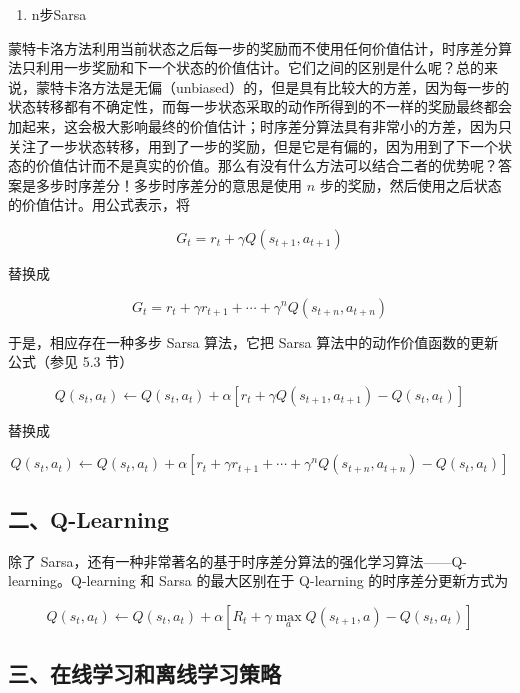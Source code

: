 \begin{enumerate}
\def\labelenumi{\arabic{enumi}.}
\setcounter{enumi}{1}
\tightlist
\item
  n步Sarsa
\end{enumerate}

蒙特卡洛方法利用当前状态之后每一步的奖励而不使用任何价值估计，时序差分算法只利用一步奖励和下一个状态的价值估计。它们之间的区别是什么呢？总的来说，蒙特卡洛方法是无偏（unbiased）的，但是具有比较大的方差，因为每一步的状态转移都有不确定性，而每一步状态采取的动作所得到的不一样的奖励最终都会加起来，这会极大影响最终的价值估计；时序差分算法具有非常小的方差，因为只关注了一步状态转移，用到了一步的奖励，但是它是有偏的，因为用到了下一个状态的价值估计而不是真实的价值。那么有没有什么方法可以结合二者的优势呢？答案是多步时序差分！多步时序差分的意思是使用 \(n\) 步的奖励，然后使用之后状态的价值估计。用公式表示，将

\[
G_t=r_t+\gamma Q(s_{t+1},a_{t+1})
\]

替换成

\[
G_t=r_t+\gamma r_{t+1}+\cdots+\gamma^n Q(s_{t+n},a_{t+n})
\]

于是，相应存在一种多步 Sarsa 算法，它把 Sarsa 算法中的动作价值函数的更新公式（参见 5.3 节）

\[
Q(s_t,a_t)\leftarrow Q(s_t,a_t)+\alpha[r_t+\gamma Q(s_{t+1},a_{t+1})-Q(s_t,a_t)]
\]

替换成

\[
Q(s_t,a_t)\leftarrow Q(s_t,a_t)+\alpha[r_t+\gamma r_{t+1}+\cdots+\gamma^n Q(s_{t+n},a_{t+n})-Q(s_t,a_t)]
\]

\hypertarget{ux4e8cq-learning}{%
\subsection{二、Q-Learning}\label{ux4e8cq-learning}}

除了 Sarsa，还有一种非常著名的基于时序差分算法的强化学习算法------Q-learning。Q-learning 和 Sarsa 的最大区别在于 Q-learning 的时序差分更新方式为

\[
Q(s_t,a_t)\leftarrow Q(s_t,a_t)+\alpha[R_t+\gamma\max_a Q(s_{t+1},a)-Q(s_t,a_t)]
\]

\hypertarget{ux4e09ux5728ux7ebfux5b66ux4e60ux548cux79bbux7ebfux5b66ux4e60ux7b56ux7565}{%
\subsection{三、在线学习和离线学习策略}\label{ux4e09ux5728ux7ebfux5b66ux4e60ux548cux79bbux7ebfux5b66ux4e60ux7b56ux7565}}

